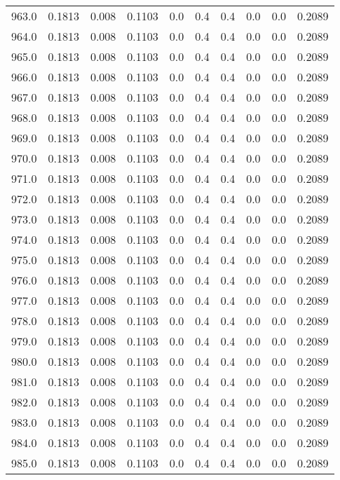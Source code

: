 \begin{longtable}{lrrrrrrrrr}
963.0 & 0.1813 & 0.008 & 0.1103 & 0.0 & 0.4 & 0.4 & 0.0 & 0.0 & 0.2089 \\
964.0 & 0.1813 & 0.008 & 0.1103 & 0.0 & 0.4 & 0.4 & 0.0 & 0.0 & 0.2089 \\
965.0 & 0.1813 & 0.008 & 0.1103 & 0.0 & 0.4 & 0.4 & 0.0 & 0.0 & 0.2089 \\
966.0 & 0.1813 & 0.008 & 0.1103 & 0.0 & 0.4 & 0.4 & 0.0 & 0.0 & 0.2089 \\
967.0 & 0.1813 & 0.008 & 0.1103 & 0.0 & 0.4 & 0.4 & 0.0 & 0.0 & 0.2089 \\
968.0 & 0.1813 & 0.008 & 0.1103 & 0.0 & 0.4 & 0.4 & 0.0 & 0.0 & 0.2089 \\
969.0 & 0.1813 & 0.008 & 0.1103 & 0.0 & 0.4 & 0.4 & 0.0 & 0.0 & 0.2089 \\
970.0 & 0.1813 & 0.008 & 0.1103 & 0.0 & 0.4 & 0.4 & 0.0 & 0.0 & 0.2089 \\
971.0 & 0.1813 & 0.008 & 0.1103 & 0.0 & 0.4 & 0.4 & 0.0 & 0.0 & 0.2089 \\
972.0 & 0.1813 & 0.008 & 0.1103 & 0.0 & 0.4 & 0.4 & 0.0 & 0.0 & 0.2089 \\
973.0 & 0.1813 & 0.008 & 0.1103 & 0.0 & 0.4 & 0.4 & 0.0 & 0.0 & 0.2089 \\
974.0 & 0.1813 & 0.008 & 0.1103 & 0.0 & 0.4 & 0.4 & 0.0 & 0.0 & 0.2089 \\
975.0 & 0.1813 & 0.008 & 0.1103 & 0.0 & 0.4 & 0.4 & 0.0 & 0.0 & 0.2089 \\
976.0 & 0.1813 & 0.008 & 0.1103 & 0.0 & 0.4 & 0.4 & 0.0 & 0.0 & 0.2089 \\
977.0 & 0.1813 & 0.008 & 0.1103 & 0.0 & 0.4 & 0.4 & 0.0 & 0.0 & 0.2089 \\
978.0 & 0.1813 & 0.008 & 0.1103 & 0.0 & 0.4 & 0.4 & 0.0 & 0.0 & 0.2089 \\
979.0 & 0.1813 & 0.008 & 0.1103 & 0.0 & 0.4 & 0.4 & 0.0 & 0.0 & 0.2089 \\
980.0 & 0.1813 & 0.008 & 0.1103 & 0.0 & 0.4 & 0.4 & 0.0 & 0.0 & 0.2089 \\
981.0 & 0.1813 & 0.008 & 0.1103 & 0.0 & 0.4 & 0.4 & 0.0 & 0.0 & 0.2089 \\
982.0 & 0.1813 & 0.008 & 0.1103 & 0.0 & 0.4 & 0.4 & 0.0 & 0.0 & 0.2089 \\
983.0 & 0.1813 & 0.008 & 0.1103 & 0.0 & 0.4 & 0.4 & 0.0 & 0.0 & 0.2089 \\
984.0 & 0.1813 & 0.008 & 0.1103 & 0.0 & 0.4 & 0.4 & 0.0 & 0.0 & 0.2089 \\
985.0 & 0.1813 & 0.008 & 0.1103 & 0.0 & 0.4 & 0.4 & 0.0 & 0.0 & 0.2089 \\

\end{longtable}
